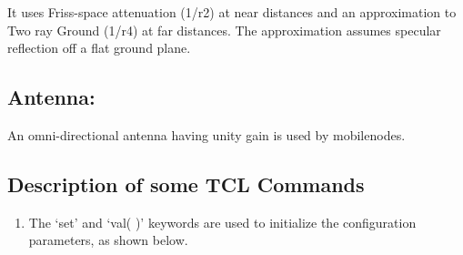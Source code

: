 \documentclass[11pt]{article}
\begin{document}
It uses Friss-space attenuation (1/r2) at near distances and an approximation
to Two ray Ground (1/r4) at far distances. The approximation assumes specular reflection off a flat
ground plane.
\subsection{Antenna: }


An omni-directional antenna having unity gain is used by mobilenodes.



\subsection{Description of some TCL Commands}

\begin{enumerate}
    \item The ‘set’ and ‘val( )’ keywords are used to initialize the configuration parameters, as shown below.
          \begin{verbatim}
        

\end{verbatim}
\end{enumerate}
\end{document}
